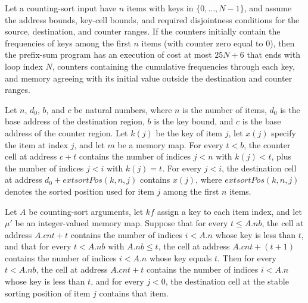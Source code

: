 \begin{theorem}
\label{Light.csPrefix_ends}
\leanok
{}
Let a counting-sort input have $n$ items with keys in $\{0,\ldots,N-1\}$, and assume the
address bounds, key-cell bounds, and required disjointness conditions for the source,
destination, and counter ranges. If the counters initially contain the frequencies of
keys among the first $n$ items (with counter zero equal to $0$), then the prefix-sum
program has an execution of cost at most $25N+6$ that ends with loop index $N$, counters
containing the cumulative frequencies through each key, and memory agreeing with its
initial value outside the destination and counter ranges.
\end{theorem}

\begin{definition}
\label{Light.CsPlaced}
\leanok
{}
Let $n$, $d_0$, $b$, and $c$ be natural numbers, where $n$ is the number of items, $d_0$
is the base address of the destination region, $b$ is the key bound, and $c$ is the base
address of the counter region. Let $k(j)$ be the key of item $j$, let $x(j)$ specify the
item at index $j$, and let $m$ be a memory map. For every $t<b$, the counter cell at
address $c+t$ contains the number of indices $j<n$ with $k(j)<t$, plus the number of
indices $j<i$ with $k(j)=t$. For every $j<i$, the destination cell at address
$d_0+	ext{sortPos}(k,n,j)$ contains $x(j)$, where $	ext{sortPos}(k,n,j)$ denotes the
sorted position used for item $j$ among the first $n$ items.
\end{definition}

\begin{theorem}
\label{Light.CsPlaced.start}
\leanok
{}
Let $A$ be counting-sort arguments, let $kf$ assign a key to each item index, and let
$\mu'$ be an integer-valued memory map. Suppose that for every $t\le A.nb$, the cell at
address $A.cnt+t$ contains the number of indices $i<A.n$ whose key is less than $t$, and
that for every $t<A.nb$ with $A.nb\le t$, the cell at address $A.cnt+(t+1)$ contains the
number of indices $i<A.n$ whose key equals $t$. Then for every $t<A.nb$, the cell at
address $A.cnt+t$ contains the number of indices $i<A.n$ whose key is less than $t$, and
for every $j<0$, the destination cell at the stable sorting position of item $j$
contains that item.
\end{theorem}

